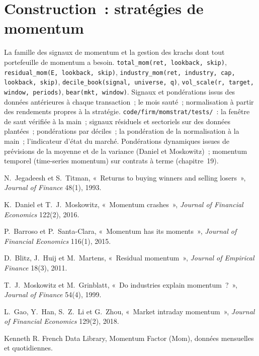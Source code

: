 \section{Construction~: stratégies de momentum}\label{bld:s1:momentum:momstrat}

\begin{build}
 La famille des signaux de momentum et la gestion des krachs dont tout portefeuille de momentum a besoin.
 \texttt{total\_mom(ret, lookback, skip)}, \texttt{residual\_mom(E, lookback, skip)},
\texttt{industry\_mom(ret, industry, cap, lookback, skip)}, \texttt{decile\_book(signal, universe, q)}, \texttt{vol\_scale(r, target, window, periods)}, \texttt{bear(mkt, window)}.
 Signaux et pondérations issus des données antérieures à chaque transaction~; le mois sauté~; normalisation à partir des rendements propres à la stratégie.
 \texttt{code/firm/momstrat/tests/}~: la fenêtre de saut vérifiée à la main~; signaux résiduels et sectoriels sur des données plantées~; pondérations par déciles~; la
pondération de la normalisation à la main~; l'indicateur d'état du marché.
 Pondérations dynamiques issues de prévisions de la moyenne et de la variance (Daniel et Moskowitz)~; momentum temporel (time-series momentum) sur contrats à terme (chapitre~19).
\end{build}

\begin{omsources}
\item N.~Jegadeesh et S.~Titman, «~Returns to buying winners and selling losers~», \emph{Journal of Finance} 48(1), 1993.
\item K.~Daniel et T.~J.~Moskowitz, «~Momentum crashes~», \emph{Journal of Financial Economics} 122(2), 2016.
\item P.~Barroso et P.~Santa-Clara, «~Momentum has its moments~», \emph{Journal of Financial Economics} 116(1), 2015.
\item D.~Blitz, J.~Huij et M.~Martens, «~Residual momentum~», \emph{Journal of Empirical Finance} 18(3), 2011.
\item T.~J.~Moskowitz et M.~Grinblatt, «~Do industries explain momentum~?~», \emph{Journal of Finance} 54(4), 1999.
\item L.~Gao, Y.~Han, S.~Z.~Li et G.~Zhou, «~Market intraday momentum~», \emph{Journal of Financial Economics} 129(2), 2018.
\item Kenneth R. French Data Library, Momentum Factor (Mom), données mensuelles et quotidiennes.
\end{omsources}

